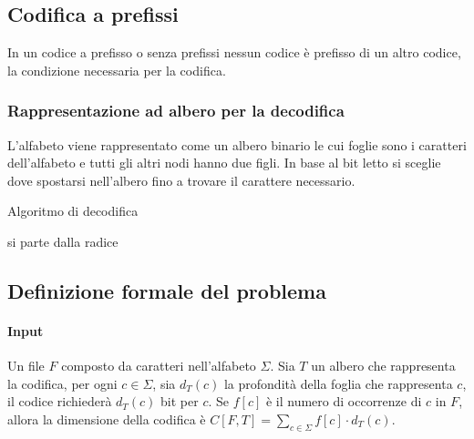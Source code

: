 \subsection{Codifica a prefissi}
In un codice a prefisso o senza prefissi nessun codice \`e prefisso di un altro codice, la condizione necessaria per la codifica. 
\subsubsection{Rappresentazione ad albero per la decodifica}
L'alfabeto viene rappresentato come un albero binario le cui foglie sono i caratteri dell'alfabeto e tutti gli altri nodi hanno due figli. In base al bit letto si sceglie dove spostarsi
nell'albero fino a trovare il carattere necessario.
\begin{algorithm}[H]
\DontPrintSemicolon
{}






\SetKwFunction{}{}
\SetKwFunction{}{}
\SetKwFunction{}{}
\SetKwFunction{}{}
\SetKwFunction{}{}


\caption{Algoritmo di decodifica}
si parte dalla radice\;
\end{algorithm}
\subsection{Definizione formale del problema}
\paragraph{Input}
Un file $F$ composto da caratteri nell'alfabeto $\Sigma$. Sia $T$ un albero che rappresenta la codifica, per ogni $c\in\Sigma$, sia $d_T(c)$ la profondit\`a della foglia che rappresenta
$c$, il codice richieder\`a $d_T(c)$ bit per $c$. Se $f[c]$ \`e il numero di occorrenze di $c$ in $F$, allora la dimensione della codifica \`e $C[F, T] = \sum\limits_{c\in\Sigma}f[c]
\cdot d_T(c)$.
